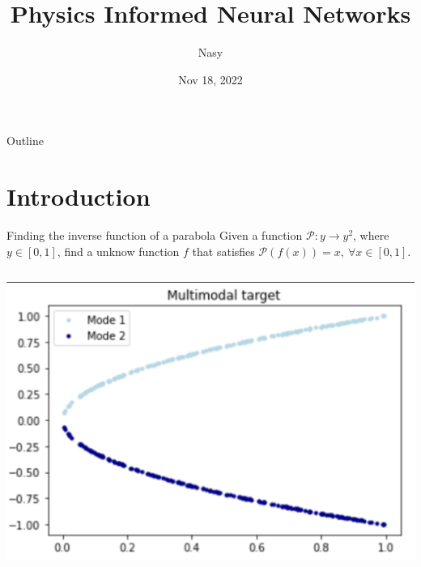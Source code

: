 \documentclass[aspectratio=1610,xcolor={dvipsnames},hyperref={colorlinks,unicode,linkcolor=violet,anchorcolor=BlueViolet,citecolor=YellowOrange,filecolor=black,urlcolor=Aquamarine}]{beamer}
\author{Nasy}
\date{Nov 18, 2022}
\title{Physics Informed Neural Networks}
\begin{document}
\maketitle
\begin{frame}{Outline}
\tableofcontents
\end{frame}


\section{Introduction}
\label{sec:org9a2c452}

\begin{frame}[label={sec:org1f5d269}]{Finding the inverse function of a parabola}
Given a function \(\mathcal{P}: y \rightarrow y^{2}\), where \(y \in
[0, 1]\), find a unknow function \(f\) that satisfies
\(\mathcal{P}(f(x)) = x,\ \forall x \in [0, 1]\).

\begin{columns}
\begin{column}{0.6\columnwidth}
\begin{center}
\includegraphics[width=.9\linewidth]{./p1.png}
\end{center}
\end{column}
\end{columns}
\end{frame}
\end{document}
